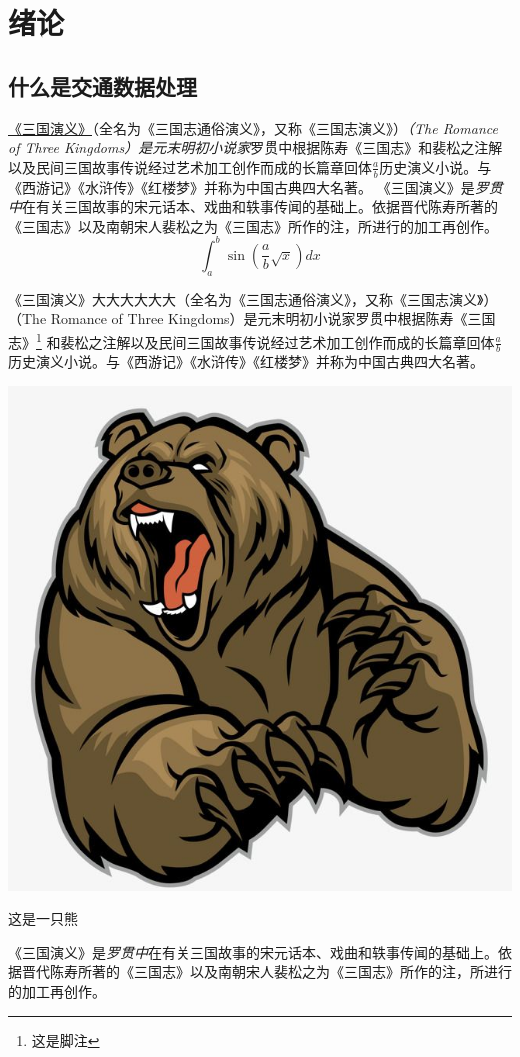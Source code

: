 \chapter{绪论}

\section{什么是交通数据处理}

\underline{《三国演义》}（全名为《三国志通俗演义》，又称《三国志演义》）\emph{（The Romance of Three Kingdoms）是元末明初小说家}罗贯中根据陈寿《三国志》和裴松之注解以及民间三国故事传说经过艺术加工创作而成的长篇章回体$\frac{a}{b}$历史演义小说。与《西游记》《水浒传》《红楼梦》并称为中国古典四大名著。
《三国演义》是\emph{罗贯中}在有关{\sffamily 三国故事的宋元话本}、戏曲和轶事传闻的基础上。依据晋代陈寿所著的《三国志》以及南朝宋人裴松之为《三国志》所作的注，所进行的加工再创作。
\begin{equation}
    \int_a^b\sin(\frac{a}{b}\sqrt{x})dx
\end{equation}

《三国演义》大大大大大大（全名为《三国志通俗演义》，又称《三国志演义》）（The Romance of Three Kingdoms）是元末明初小说家罗贯中根据陈寿《三国志》\footnote{这是脚注}%
和裴松之注解以及民间三国故事\cite{DiChenHua2021}传说经过艺术加工创作而成的长篇章回体$\frac{a}{b}$历史演义小说。与《西游记》《水浒传》《红楼梦》并称为中国古典四大名著。
\begin{marginfigure}[1.5cm]
\includegraphics[width=\linewidth]{images/bear.jpeg}
\caption{这是一只熊}
\end{marginfigure}
《三国演义》是\emph{罗贯中}在有关{\sffamily 三国故事的宋元话本}、戏曲和轶事传闻的基础上。依据晋代陈寿所著的《三国志》以及南朝宋人裴松之为《三国志》所作的注，所进行的加工再创作。

